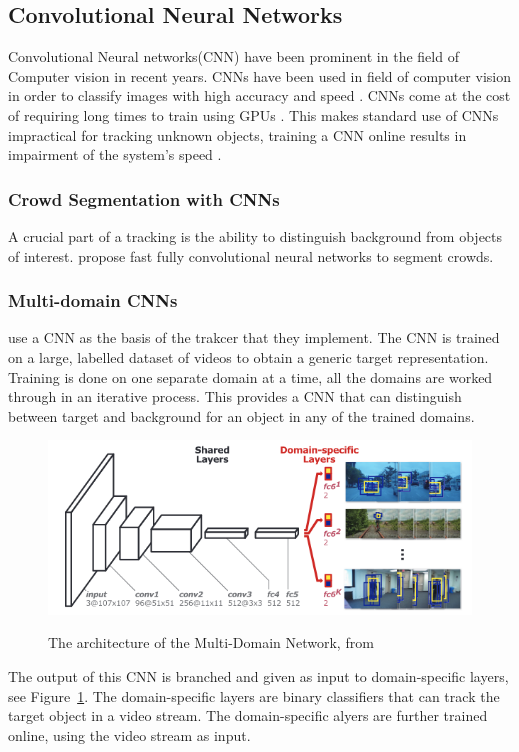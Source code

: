 \subsection{Convolutional Neural Networks}
  Convolutional Neural networks(CNN) have been prominent in the field of Computer vision in recent years.
  CNNs have been used in field of computer vision in order to classify images with high accuracy and speed \cite{razavian2014}.
  CNNs come at the cost of requiring long times to train using GPUs \cite{krizhevsky2012}.
  This makes standard use of CNNs impractical for tracking unknown objects, training a CNN online results in impairment of the system's speed \cite{bertinetto2016}.

  \subsubsection{Crowd Segmentation with CNNs}
  A crucial part of a tracking is the ability to distinguish background from objects of interest.
  \citeauthor{kang2014} \cite{kang2014} propose fast fully convolutional neural networks to segment crowds.
  

  \subsubsection{Multi-domain CNNs}
  \citeauthor{CNNTracking} \cite{CNNTracking} use a CNN as the basis of the trakcer that they implement.
  The CNN is trained on a large, labelled dataset of videos to obtain a generic target representation.
  Training is done on one separate domain at a time, all the domains are worked through in an iterative process.
  This provides a CNN that can distinguish between target and background for an object in any of the trained domains.

  \begin{figure}[!ht]
    \centering
    \includegraphics[scale=0.5]{MDNet.png}
    \label{fig:mdnet}
    \caption{The architecture of the Multi-Domain Network, from \cite{CNNTracking}}
  \end{figure}
  The output of this CNN is branched and given as input to domain-specific layers, see Figure~\ref{fig:mdnet}.
  The domain-specific layers are binary classifiers that can track the target object in a video stream.
  The domain-specific alyers are further trained online, using the video stream as input.

